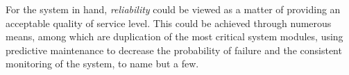 For the system in hand, \emph{reliability} could be viewed as a matter of providing an acceptable quality of service level. This could be achieved through numerous means, among which are duplication of the most critical system modules, using predictive maintenance to decrease the probability of failure and the consistent monitoring of the system, to name but a few.